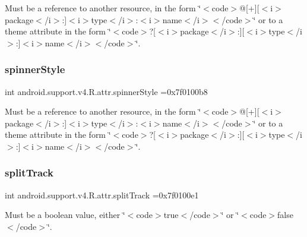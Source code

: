 Must be a reference to another resource, in the form \char`\"{}$<$code$>$@\mbox{[}+\mbox{]}\mbox{[}$<$i$>$package$<$/i$>$\+:\mbox{]}$<$i$>$type$<$/i$>$\+:$<$i$>$name$<$/i$>$$<$/code$>$\char`\"{} or to a theme attribute in the form \char`\"{}$<$code$>$?\mbox{[}$<$i$>$package$<$/i$>$\+:\mbox{]}\mbox{[}$<$i$>$type$<$/i$>$\+:\mbox{]}$<$i$>$name$<$/i$>$$<$/code$>$\char`\"{}. \mbox{\label{classandroid_1_1support_1_1v4_1_1R_1_1attr_ad20f2744efe2d759417593eaadb38d74}} 
\subsubsection{\texorpdfstring{spinner\+Style}{spinnerStyle}}
{\footnotesize\ttfamily int android.\+support.\+v4.\+R.\+attr.\+spinner\+Style =0x7f0100b8\hspace{0.3cm}{\ttfamily [static]}}

Must be a reference to another resource, in the form \char`\"{}$<$code$>$@\mbox{[}+\mbox{]}\mbox{[}$<$i$>$package$<$/i$>$\+:\mbox{]}$<$i$>$type$<$/i$>$\+:$<$i$>$name$<$/i$>$$<$/code$>$\char`\"{} or to a theme attribute in the form \char`\"{}$<$code$>$?\mbox{[}$<$i$>$package$<$/i$>$\+:\mbox{]}\mbox{[}$<$i$>$type$<$/i$>$\+:\mbox{]}$<$i$>$name$<$/i$>$$<$/code$>$\char`\"{}. \mbox{\label{classandroid_1_1support_1_1v4_1_1R_1_1attr_ac4a39d568e4a2e6074984c53e7769d38}} 
\subsubsection{\texorpdfstring{split\+Track}{splitTrack}}
{\footnotesize\ttfamily int android.\+support.\+v4.\+R.\+attr.\+split\+Track =0x7f0100e1\hspace{0.3cm}{\ttfamily [static]}}

Must be a boolean value, either \char`\"{}$<$code$>$true$<$/code$>$\char`\"{} or \char`\"{}$<$code$>$false$<$/code$>$\char`\"{}. 

